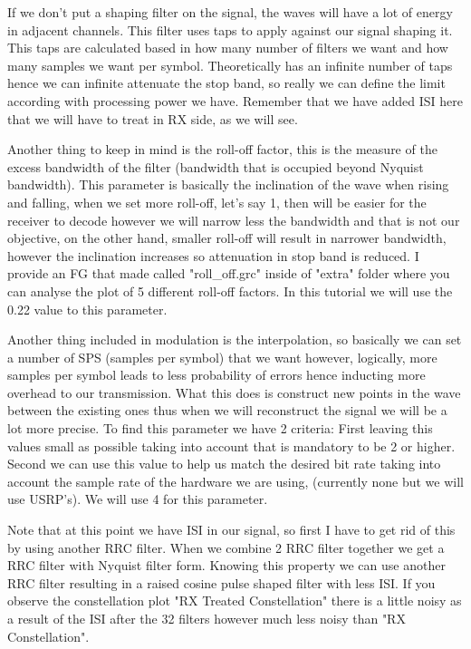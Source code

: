 \documentclass[a4paper, 10pt, conference]{ieeeconf}      %
\begin{document}
   If we don't put a shaping filter on the signal, the waves will have a lot of energy in adjacent channels. This filter uses taps to apply against our signal shaping it. This taps are calculated based in how many number of filters we want and how many samples we want per symbol. Theoretically has an infinite number of taps hence we can infinite attenuate the stop band, so really we can define the limit according with processing power we have. Remember that we have added ISI here that we will have to treat in RX side, as we will see.
   

    
    Another thing to keep in mind is the roll-off factor, this is the measure of the excess bandwidth of the filter (bandwidth that is occupied beyond Nyquist bandwidth). This parameter is basically the inclination of the wave when rising and falling, when we set more roll-off, let's say 1, then will be easier for the receiver to decode however we will narrow less the bandwidth and that is not our objective, on the other hand, smaller roll-off will result in narrower bandwidth, however the inclination increases so attenuation in stop band is reduced.
    I provide an FG that made called "roll\_off.grc" inside of "extra" folder where you can analyse the plot of 5 different roll-off factors. In this tutorial we will use the 0.22 value to this parameter.
    
    Another thing included in modulation is the interpolation, so basically we can set a number of SPS (samples per symbol) that we want however, logically, more samples per symbol leads to less probability of errors hence inducting more overhead to our transmission. What this does is construct new points in the wave between the existing ones thus when we will reconstruct the signal we will be a lot more precise. To find this parameter we have 2 criteria:  First leaving this values small as possible taking into account that is mandatory to be 2 or higher. Second we can use this value to help us match the desired bit rate taking into account the sample rate of the hardware we are using, (currently none but we will use USRP's). We will use 4 for this parameter.
    
    Note that at this point we have ISI in our signal, so first I have to get rid of this by using another RRC filter. When we combine 2 RRC filter together we get a RRC filter with Nyquist filter form. Knowing this property we can use another RRC filter resulting in a raised cosine pulse shaped filter with less ISI. If you observe the constellation plot "RX Treated Constellation" there is a little noisy as a result of the ISI after the 32 filters however much less noisy than "RX Constellation". 
    
\end{document}
